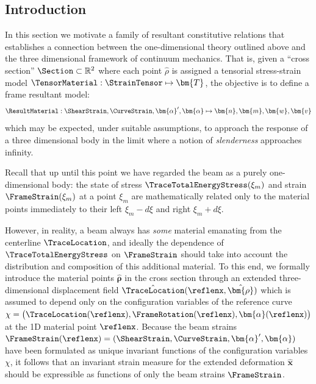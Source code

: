 \subsection{Introduction}
In this section we motivate a family of resultant constitutive relations that establishes a connection between the one-dimensional theory outlined above and the three dimensional framework of continuum mechanics.
%
That is, given a ``cross section'' \(\Section \subset \mathbb{R}^2\) where each point \(\hat{\rho}\) is assigned a tensorial stress-strain model \(\TensorMaterial: \StrainTensor \mapsto \bm{T}\), 
the objective is to define a frame resultant model:
\[
\ResultMaterial : \ShearStrain,\CurveStrain,\bm{\alpha}',\bm{\alpha} \mapsto \bm{n},\bm{m},\bm{w},\bm{v}
\]
which may be expected, under suitable assumptions, to approach the response of a three dimensional body in the limit where a notion of \emph{slenderness} approaches infinity. 
%
%
%
%


Recall that up until this point we have regarded the beam as a purely one-dimensional body: the state of stress $\TraceTotalEnergyStress(\xi_m)$ and strain $\FrameStrain(\xi_m)$ at a point $\xi_m$ are mathematically related only to the material points immediately to their left $\xi_m-d\xi$ and right $\xi_m+d\xi$.

However, in reality, a beam always has \emph{some} material emanating from the centerline \(\TraceLocation\), and ideally the dependence of $\TraceTotalEnergyStress$ on $\FrameStrain$ should take into account the distribution and composition of this additional material. 
To this end, we formally introduce the material points $\hat{\bm{\rho}}$ in the cross section through an extended three-dimensional displacement field $\hat{\TraceLocation}(\reflenx, \hat{\bm{\rho}})$ which is assumed to depend only on the configuration variables of the reference curve \(\chi=\bigl(\TraceLocation(\reflenx), \FrameRotation (\reflenx), \bm{\alpha}(\reflenx)\bigr)\) at the 1D material point \(\reflenx\). 
Because the beam strains \(\FrameStrain(\reflenx) = (\ShearStrain , \CurveStrain , \bm{\alpha}^{\prime}, \bm{\alpha})\) have been formulated as unique invariant functions of the configuration variables $\chi$, it follows that an invariant strain measure for the extended deformation $\hat{\bm{x}}$ should be expressible as functions of only the beam strains $\FrameStrain$.

